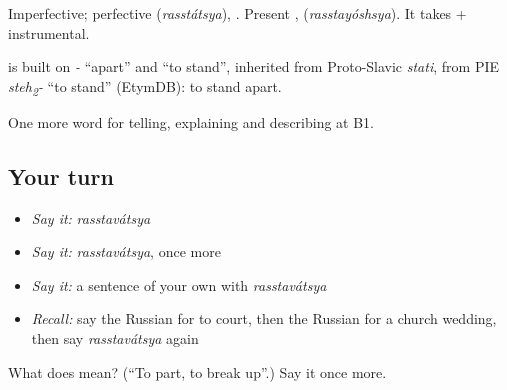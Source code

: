 Imperfective; perfective \emph{} (\emph{rasstátsya}), \emph{}. Present \emph{}, \emph{} (\emph{rasstayóshsya}). It takes \emph{} + instrumental.

\begin{cousinweb}
\emph{} is built on \emph{-} \textquotedblleft{}apart\textquotedblright{} and \emph{} \textquotedblleft{}to stand\textquotedblright{}, inherited from Proto-Slavic \emph{stati}, from PIE \emph{steh\textsubscript{2}-} \textquotedblleft{}to stand\textquotedblright{} (EtymDB): to stand apart.
\end{cousinweb}

\begin{grammarlens}[title={What you've built}]
One more word for telling, explaining and describing at B1.
\end{grammarlens}

\subsection*{Your turn}
\begin{itemize}
\raggedright
  \item \emph{Say it:} \emph{rasstavátsya}
  \item \emph{Say it:} \emph{rasstavátsya}, once more
  \item \emph{Say it:} a sentence of your own with \emph{rasstavátsya}
  \item \emph{Recall:} say the Russian for to court, then the Russian for a church wedding, then say \emph{rasstavátsya} again
\end{itemize}

\begin{tcolorbox}[breakable,colback=teal!4,colframe=teal!35!black,title={Before you move on}]
What does  mean? (\textquotedblleft{}To part, to break up\textquotedblright{}.) Say it once more.
\end{tcolorbox}
